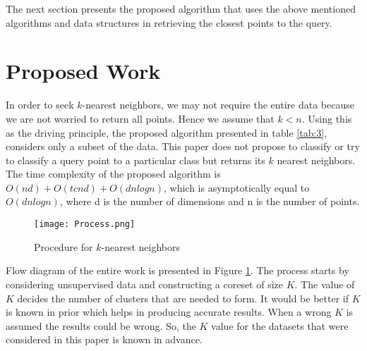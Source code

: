 \documentclass[runningheads]{llncs}
\begin{document}
The next section presents the proposed algorithm that uses the above mentioned algorithms and data structures in retrieving the closest points to the query.

\section{Proposed Work}
\label{sec:3}
In order to seek $k$-nearest neighbors, we may not require the entire data because we are not worried to return all points. Hence we assume that $k<n$. Using this as the driving principle, the proposed algorithm presented in table \ref{tab:3}, considers only a subset of the data. This paper does not propose to classify or try to classify a query point to a particular class but returns its $k$ nearest neighbors. The time complexity of the proposed algorithm is $O(nd)+O(tcnd)+O(dnlogn)$, which is asymptotically equal to $O(dnlogn)$, where d is the number of dimensions and n is the number of points.

\begin{figure}[!b]
	\texttt{[image: Process.png]}
	\caption{Procedure for $k$-nearest neighbors}
	\label{fig:2}       %
\end{figure}

Flow diagram of the entire work is presented in Figure \ref{fig:2}. The process starts by considering unsupervised data and constructing a coreset of size $K$. The value of $K$ decides the number of clusters that are needed to form. It would be better if $K$ is known in prior which helps in producing accurate results. When a wrong $K$ is assumed the results could be wrong. So, the $K$ value for the datasets that were considered in this paper is known in advance.
\end{document}
